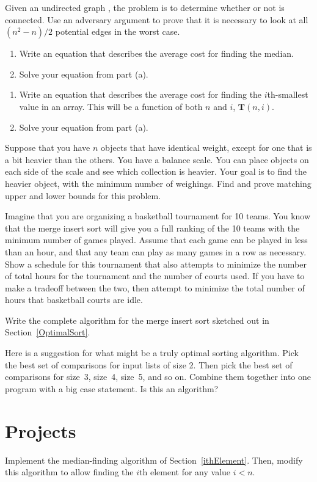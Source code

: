 \begin{exercises}
\item
Given an undirected graph , the problem is to determine whether
or not  is connected.
Use an adversary argument to prove that it is necessary to look at all
\((n^2-n)/2\) potential edges in the worst case.

\item
\begin{enumerate}
\item Write an equation that describes the average cost for finding
the median.
\item Solve your equation from part (a).
\end{enumerate}

\item
\begin{enumerate}
\item Write an equation that describes the average cost for finding the
\(i\)th-smallest value in an array.
This will be a function of both \(n\) and \(i\), \(\textbf{T}(n, i)\).
\item Solve your equation from part (a).
\end{enumerate}

\item
Suppose that you have $n$ objects that have identical weight, except
for one that is a bit heavier than the others.
You have a balance scale.
You can place objects on each side of the scale and see which
collection is heavier.
Your goal is to find the heavier object, with the minimum number of
weighings.
Find and prove matching upper and lower bounds for this problem.

\item
Imagine that you are organizing a basketball tournament for 10 teams.
You know that the merge insert sort will give you a full ranking of
the 10 teams with the minimum number of games played.
Assume that each game can be played in less than an hour, and that any
team can play as many games in a row as necessary.
Show a schedule for this tournament that also attempts to minimize the
number of total hours for the tournament and the number of courts
used.
If you have to make a tradeoff between the two, then attempt to
minimize the total number of hours that basketball courts are idle.

\item
Write the complete algorithm for the merge insert sort sketched out in
Section~\ref{OptimalSort}.

\item
Here is a suggestion for what might be a truly optimal sorting
algorithm.
Pick the best set of comparisons for input lists of size 2.
Then pick the best set of comparisons for size~3, size~4, size~5,
and so on. 
Combine them together into one program with a big case statement.
Is this an algorithm?

\end{exercises}

\section{Projects}

\begin{projects}

\item
Implement the median-finding algorithm of Section~\ref{ithElement}.
Then, modify this algorithm to allow finding the \(i\)th element for
any value \(i<n\).
\end{projects}

